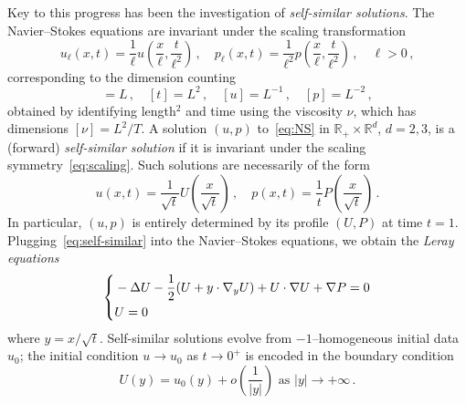 \documentclass[12pt,reqno]{amsart}
\theoremstyle{plain}
\theoremstyle{definition}
\newcommand{\R}{\mathbb{R}}
\renewcommand{\:}{\colon}
\let\div\relax
\DeclareMathOperator{\div}{div}
\numberwithin{equation}{section}
\numberwithin{figure}{section}
\begin{document}
Key to this progress has been the investigation of \emph{self-similar solutions}. The Navier--Stokes equations are invariant under the scaling transformation
\begin{equation}\label{eq:scaling}
    u_\ell(x,t) = \frac{1}{\ell} u \left( \frac{x}{\ell} , \frac{t}{\ell^2} \right) \, , \quad p_\ell(x,t) = \frac{1}{\ell^2} p\left( \frac{x}{\ell} , \frac{t}{\ell^2} \right) \, ,  \quad \ell > 0 \, ,
\end{equation}
corresponding to the dimension counting~\cite[(1.9)]{ckn}
\begin{equation}
    [x] = L \, , \quad [t] = L^2 \, , \quad [u] = L^{-1} \, ,  \quad [p] = L^{-2} \, ,
\end{equation}
obtained by identifying length${}^2$ and time using the viscosity $\nu$, which has dimensions $[\nu] = L^2/T$. A solution $(u,p)$ to~\eqref{eq:NS} in $\R_+ \times \R^d$, $d=2,3$, is a (forward) \emph{self-similar solution} if it is invariant under the scaling symmetry~\eqref{eq:scaling}. Such solutions are necessarily of the form
\begin{equation} \label{eq:self-similar}
    u(x,t) = \frac{1}{\sqrt{t}} U \left( \frac{x}{\sqrt{t}} \right) \, , \quad p(x,t) = \frac{1}{t} P \left( \frac{x}{\sqrt{t}} \right) \, .
\end{equation}
In particular, $(u,p)$ is entirely determined by its profile $(U,P)$ at time $t=1$. Plugging~\eqref{eq:self-similar} into the Navier--Stokes equations, we obtain the \emph{Leray equations}
\begin{equation}
    \label{eq:LerayEquations}
    \left\{
\begin{aligned}
	&- \Delta U - \frac{1}{2} (U + y \cdot \nabla_y U) + U \cdot \nabla U + \nabla P = 0 \\
    &\div U = 0
\end{aligned}\right.
\end{equation}
where $y = x/\sqrt{t}$. 
Self-similar solutions evolve from $-1$--homogeneous initial data $u_0$; the initial condition $u \to u_0$ as $t \to 0^+$ is encoded in the boundary condition
\begin{equation}
    \label{eq:LerayEquationsBC}
    U(y) = u_0(y) + o \left( \frac{1}{|y|} \right) \text{ as } |y| \to +\infty \, .
\end{equation}
\end{document}
